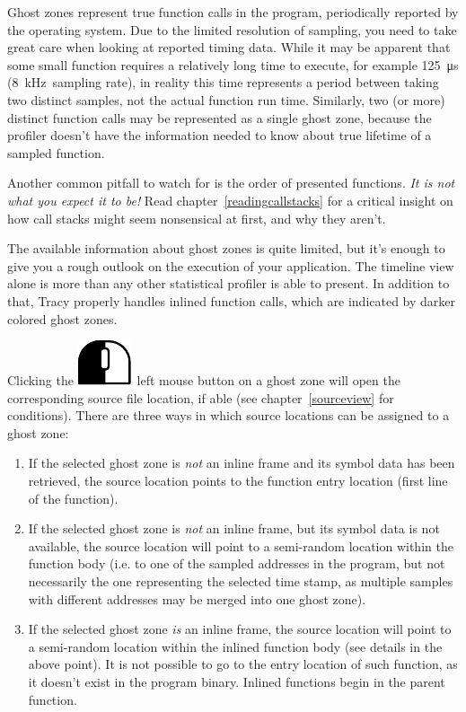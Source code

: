 \documentclass[hidelinks,titlepage,a4paper]{article}
\newcommand{\LMB}{\includegraphics[height=.8\baselineskip]{icons/lmb}}
\begin{document}
Ghost zones represent true function calls in the program, periodically reported by the operating system. Due to the limited resolution of sampling, you need to take great care when looking at reported timing data. While it may be apparent that some small function requires a relatively long time to execute, for example 125~\si{\micro\second} (8~kHz~sampling rate), in reality this time represents a period between taking two distinct samples, not the actual function run time. Similarly, two (or more) distinct function calls may be represented as a single ghost zone, because the profiler doesn't have the information needed to know about true lifetime of a sampled function.

Another common pitfall to watch for is the order of presented functions. \emph{It is not what you expect it to be!} Read chapter~\ref{readingcallstacks} for a critical insight on how call stacks might seem nonsensical at first, and why they aren't.

The available information about ghost zones is quite limited, but it's enough to give you a rough outlook on the execution of your application. The timeline view alone is more than any other statistical profiler is able to present. In addition to that, Tracy properly handles inlined function calls, which are indicated by darker colored ghost zones.

Clicking the \LMB{}~left mouse button on a ghost zone will open the corresponding source file location, if able (see chapter~\ref{sourceview} for conditions). There are three ways in which source locations can be assigned to a ghost zone:

\begin{enumerate}
\item If the selected ghost zone is \emph{not} an inline frame and its symbol data has been retrieved, the source location points to the function entry location (first line of the function).
\item If the selected ghost zone is \emph{not} an inline frame, but its symbol data is not available, the source location will point to a semi-random location within the function body (i.e. to one of the sampled addresses in the program, but not necessarily the one representing the selected time stamp, as multiple samples with different addresses may be merged into one ghost zone).
\item If the selected ghost zone \emph{is} an inline frame, the source location will point to a semi-random location within the inlined function body (see details in the above point). It is not possible to go to the entry location of such function, as it doesn't exist in the program binary. Inlined functions begin in the parent function.
\end{enumerate}
\end{document}

